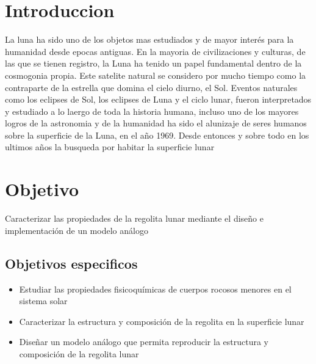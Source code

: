 \documentclass[12pt]{article}
\begin{document}
\section{Introduccion}
La luna ha sido uno de los objetos mas estudiados y de mayor interés para la humanidad desde epocas antiguas. En la mayoria de civilizaciones y culturas,
de las que se tienen registro, la Luna ha tenido un papel fundamental dentro de la cosmogonia propia. Este satelite natural se considero por mucho tiempo como 
la contraparte de la estrella que domina el cielo diurno, el Sol. Eventos naturales como los eclipses de Sol, los eclipses de Luna y el ciclo lunar, fueron interpretados
y estudiado a lo laergo de toda la historia humana, incluso uno de los mayores logros de la astronomia y de la humanidad ha sido el alunizaje de seres humanos sobre la superficie 
de la Luna, en el año 1969. Desde entonces y sobre todo en los ultimos años la busqueda por habitar la superficie lunar


\section{Objetivo}

Caracterizar las propiedades de la regolita lunar mediante el diseño e implementación  de un modelo análogo

\subsection{Objetivos especificos}
\begin{itemize}
    \item Estudiar  las propiedades fisicoquímicas  de cuerpos rocosos menores en el sistema solar
    \item Caracterizar  la estructura y composición de la regolita en la superficie lunar
    \item Diseñar un modelo análogo que permita reproducir la estructura y composición de la regolita lunar
\end{itemize}


% 
% 
% 
% 
\end{document}
